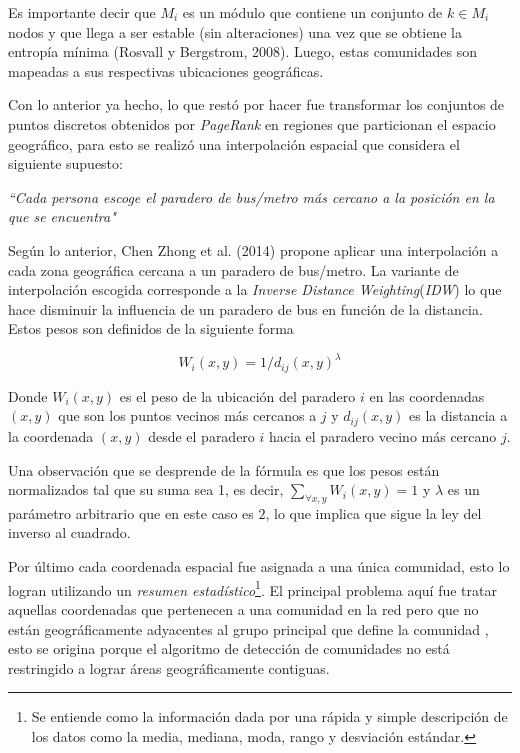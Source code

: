 \documentclass[12pt]{article}
\begin{document}
Es importante decir que $M_i$ es un módulo que contiene un conjunto de $k \in M_i$ nodos y que llega a ser estable (sin alteraciones) una vez que se obtiene la entropía mínima (Rosvall y Bergstrom, 2008). Luego, estas comunidades son mapeadas a sus respectivas ubicaciones geográficas.

Con lo anterior ya hecho, lo que restó por hacer fue transformar los conjuntos de puntos discretos obtenidos por \textit{PageRank} en regiones que particionan el espacio geográfico, para esto se realizó una interpolación espacial que considera el siguiente supuesto:

\begin{center}
	\textit{``Cada persona escoge el paradero de bus/metro más cercano a la posición en la que se encuentra"}
\end{center} 

Según lo anterior, Chen Zhong et al. (2014) propone aplicar una interpolación a cada zona geográfica cercana a un paradero de bus/metro. La variante de interpolación escogida corresponde a la \textit{Inverse Distance Weighting}(\textit{IDW}) lo que hace disminuir la influencia de un paradero de bus en función de la distancia. Estos pesos son definidos de la siguiente forma 

$$
	W_i(x,y) = 1/d_{ij} (x,y)^\lambda
$$

Donde $W_i(x,y)$ es el peso de la ubicación del paradero $i$ en las coordenadas $(x,y)$ que son los puntos vecinos más cercanos a $j$ y $d_{ij} (x,y)$ es la distancia a la coordenada $(x,y)$ desde el paradero $i$ hacia el paradero vecino más cercano $j$.

Una observación que se desprende de la fórmula es que los pesos están normalizados tal que su suma sea 1, es decir, $\sum_{\forall x,y} W_i (x,y)=1$ y $\lambda$ es un parámetro arbitrario que en este caso es $2$, lo que implica que sigue la ley del inverso al cuadrado.

Por último cada coordenada espacial fue asignada a una única comunidad, esto lo logran utilizando un  \textit{resumen estadístico}\footnote{Se entiende como la información dada por una rápida y simple descripción de los datos como la media, mediana, moda, rango y desviación estándar.}. El principal problema aquí fue tratar aquellas coordenadas que pertenecen a una comunidad en la red pero que no están geográficamente adyacentes al grupo principal que define la comunidad	, esto se origina porque el algoritmo de detección de comunidades no está restringido a lograr áreas geográficamente contiguas.
\end{document}
